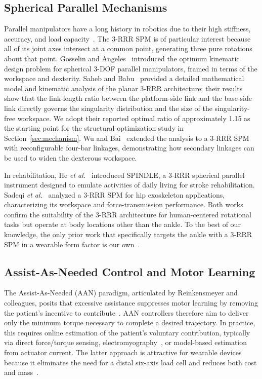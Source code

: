 \documentclass[conference]{IEEEtran}
\begin{document}
\subsection{Spherical Parallel Mechanisms}

Parallel manipulators have a long history in robotics due to their high stiffness, accuracy, and load capacity~\cite{merlet2006jacobian}. The 3-RRR SPM is of particular interest because all of its joint axes intersect at a common point, generating three pure rotations about that point. Gosselin and Angeles~\cite{gosselin1989optimum} introduced the optimum kinematic design problem for spherical 3-DOF parallel manipulators, framed in terms of the workspace and dexterity. Saheb and Babu~\cite{saheb2021math} provided a detailed mathematical model and kinematic analysis of the planar 3-RRR architecture; their results show that the link-length ratio between the platform-side link and the base-side link directly governs the singularity distribution and the size of the singularity-free workspace. We adopt their reported optimal ratio of approximately 1.15 as the starting point for the structural-optimization study in Section~\ref{sec:mechanism}. Wu and Bai~\cite{wu2019designandkinematic} extended the analysis to a 3-RRR SPM with reconfigurable four-bar linkages, demonstrating how secondary linkages can be used to widen the dexterous workspace.

In rehabilitation, He \emph{et al.}~\cite{he2021spindle} introduced SPINDLE, a 3-RRR spherical parallel instrument designed to emulate activities of daily living for stroke rehabilitation. Sadeqi \emph{et al.}~\cite{sadeqi2017hip} analyzed a 3-RRR SPM for hip exoskeleton applications, characterizing its workspace and force-transmission performance. Both works confirm the suitability of the 3-RRR architecture for human-centered rotational tasks but operate at body locations other than the ankle. To the best of our knowledge, the only prior work that specifically targets the ankle with a 3-RRR SPM in a wearable form factor is our own~\cite{zhang2025rehab}.

\subsection{Assist-As-Needed Control and Motor Learning}

The Assist-As-Needed (AAN) paradigm, articulated by Reinkensmeyer and colleagues, posits that excessive assistance suppresses motor learning by removing the patient's incentive to contribute~\cite{cai2006implications,marchal2009review}. AAN controllers therefore aim to deliver only the minimum torque necessary to complete a desired trajectory. In practice, this requires online estimation of the patient's voluntary contribution, typically via direct force/torque sensing, electromyography~\cite{hybart2022emg}, or model-based estimation from actuator current. The latter approach is attractive for wearable devices because it eliminates the need for a distal six-axis load cell and reduces both cost and mass~\cite{zhang2015torque,jackson2019heuristic}.
\end{document}
